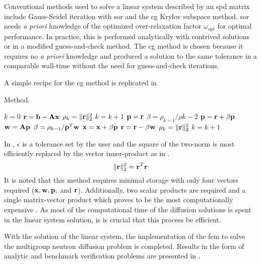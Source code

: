     Conventional methods used to solve a linear system described by an \gls{spd}
    matrix include Gauss-Seidel iteration with \gls{sor} and the \gls{cg} Krylov 
    subspace method. \gls{sor} needs \textit{a priori} knowledge of the 
    optimized over-relaxation factor $\omega_{opt}$ for optimal performance. In 
    practice, this is performed analytically with contrived solutions or in a 
    modified guess-and-check method. The \gls{cg} method is chosen because it 
    requires no \textit{a priori} knowledge and produced a solution to the same 
    tolerance in a comparable wall-time without the need for guess-and-check 
    iterations.
    
    A simple recipe for the \gls{cg} method is replicated in
     \cite{Kelley1995IterativeEquations}
    
    \begin{algorithm}
      \caption{ Method.}
      \label{algorithm:CG}
      \begin{algorithmic}[1]
        \State $k = 0$
        \State $\mathbf{r} = \mathbf{b} - \mathbf{A} \mathbf{x}$
        \State $\rho_k = \|\mathbf{r}\|_2^2$
        \State $k = k + 1$
            \State $\mathbf{p} = \mathbf{r}$
          \Else
            \State $\beta = \rho_{k-1} / \rho{k-2}$
            \State $\mathbf{p} = \mathbf{r} + \beta \mathbf{p}$
          \EndIf
          \State $\mathbf{w} = \mathbf{A} \mathbf{p}$
          \State $\beta = \rho_{k-1} / \mathbf{p}^{T} \mathbf{w}$
          \State $\mathbf{x} = \mathbf{x} + \beta \mathbf{p}$
          \State $\mathbf{r} = \mathbf{r} - \beta \mathbf{w}$
          \State $\rho_k = \| \mathbf{r} \|_2^2$
          \State $k=k+1$
        \EndWhile
      \end{algorithmic}
    \end{algorithm}
    
    In , $\epsilon$ is a tolerance set by the user 
    and the square of the two-norm is most efficiently replaced by the vector
    inner-product as in . 
    \begin{equation}
      \label{eq:two_norm_inner}
      \|\mathbf{r}\|_2^2 = \mathbf{r}^{T} \mathbf{r}
    \end{equation}
    It is noted that this method requires minimal storage with only four vectors 
    required ($\mathbf{x}, \mathbf{w}, \mathbf{p},$ and $\mathbf{r}$). Additionally, two scalar products 
    are required and a single matrix-vector product which proves to be the most 
    computationally expensive \cite{Kelley1995IterativeEquations}. As most of 
    the computational time of the diffusion solutions is spent in the linear 
    system solution, is is crucial that this process be efficient.

    With the solution of the linear system, the implementation of the \gls{fem}
    to solve the multigroup neutron diffusion problem is completed. Results in 
    the form of analytic and benchmark verification problems are presented in
    .
